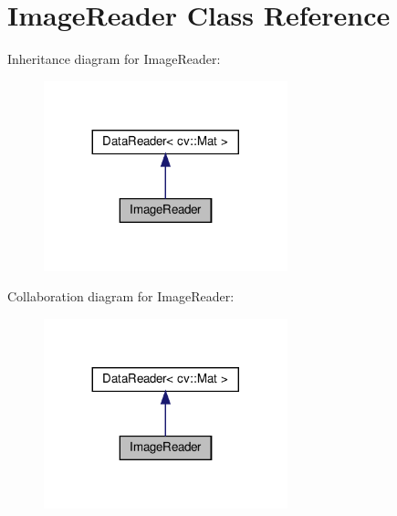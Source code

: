 \hypertarget{classImageReader}{}\section{Image\+Reader Class Reference}
\label{classImageReader}


Inheritance diagram for Image\+Reader\+:
\nopagebreak
\begin{figure}[H]
\begin{center}
\leavevmode
\includegraphics[width=200pt]{classImageReader__inherit__graph}
\end{center}
\end{figure}


Collaboration diagram for Image\+Reader\+:
\nopagebreak
\begin{figure}[H]
\begin{center}
\leavevmode
\includegraphics[width=200pt]{classImageReader__coll__graph}
\end{center}
\end{figure}
